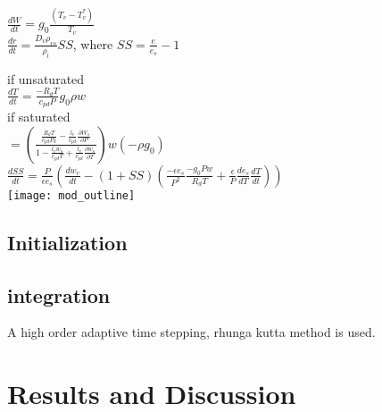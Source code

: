 \documentclass[11pt]{article} %
\begin{document}
$\frac{dW}{dt} = g_{0} \frac{(T_{v} - T_{v}^{*})}{T_{v}}$\\

$\frac{dr}{dt} = \frac{D_{v}\rho_{vs}}{\rho_{l}}SS$, where $SS = \frac{e}{e_{s}} - 1$

if unsaturated\\

$\frac{dT}{dt} = \frac{-R_{d} T}{c_{pd}P}g_{0}\rho w$\\

if saturated\\

             $ =  \left(\frac{\frac{R_{d} T}{c_{pd}P_{d}} - \frac{l_{v}}{c_{pd}}\frac{\partial W_{s}}{\partial P}}{1 - \frac{l_{v}w_{s}}{c_{pd}T} + \frac{l_{v}}{c_{pd}} \frac{\partial w_{s}}{\partial T}}\right) w(-\rho g_{0})$\\

$ \frac{dSS}{dt} = \frac{P}{\epsilon e_{s}}(\frac{dw_{v}}{dt} - (1+SS)(\frac{-\epsilon e_{s}}{P^{2}}\frac{-g_{0}Pw}{R_{d}T} + \frac{\epsilon}{P}\frac{de_{s}}{dT}\frac{dT}{dt}))$\\

\texttt{[image: mod\_outline]}

\subsection{Initialization}

\subsection{integration}

A high order adaptive time stepping, rhunga kutta method is used.

\section{Results and Discussion}
\end{document}
